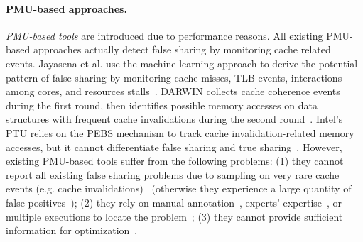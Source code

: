 \paragraph{PMU-based approaches.} \emph{PMU-based tools} are introduced due to performance reasons. All existing PMU-based approaches actually detect false sharing by monitoring cache related events. Jayasena et al. use the machine learning approach to derive the potential pattern of false sharing by monitoring cache misses, TLB events, interactions among cores, and resources stalls~\cite{mldetect}. DARWIN collects cache coherence events during the first round, then identifies possible memory accesses on data structures with frequent cache invalidations during the second round~\cite{Wicaksono11detectingfalse}. Intel's PTU relies on the PEBS mechanism to track cache invalidation-related memory accesses, but it cannot differentiate false sharing and true sharing~\cite{detect:ptu}. However, existing PMU-based tools suffer from the following problems: (1) they cannot report all existing false sharing problems due to sampling on very rare cache events (e.g. cache invalidations)~\cite{mldetect, Wicaksono11detectingfalse, DProf} (otherwise they experience a large quantity of false positives~\cite{detect:ptu}); (2) they rely on manual annotation~\cite{DProf}, experts' expertise~\cite{Wicaksono11detectingfalse, detect:ptu}, or multiple executions to locate the problem~\cite{Wicaksono11detectingfalse}; (3) they cannot provide sufficient information for optimization~\cite{mldetect, Wicaksono11detectingfalse, detect:ptu, DProf}.


